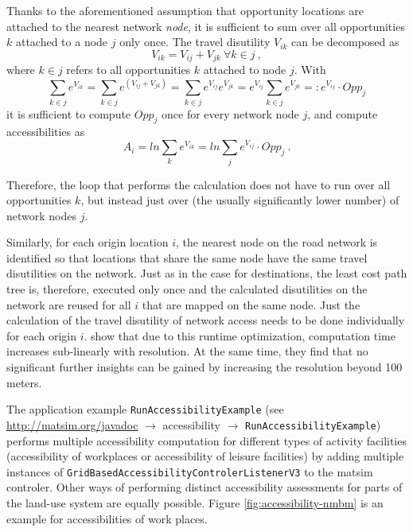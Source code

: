 Thanks to the aforementioned assumption that opportunity locations are attached to the nearest network 
\emph{node}, it is sufficient to sum over all opportunities $k$ attached to a node $j$ only 
once. The travel disutility $V_{ik}$ can be decomposed as
\begin{equation}
V_{ik} = V_{ij} + V_{jk} \ \forall k \in j \ ,
\end{equation}
where $k \in j$ refers to all opportunities $k$ attached to node $j$. With
\begin{equation}
\sum_{k \in j} e^{ V_{ik}} 
%
= \sum_{k \in j} e^{ (V_{ij}+ V_{jk})} 
%
= \sum_{k \in j} e^{ V_{ij}} e^{ V_{jk}} 
%
= e^{ V_{ij}} \sum_{k \in j} e^{ V_{jk}} 
%
=: e^{ V_{ij}} \cdot Opp_j
\end{equation} 
it is sufficient to compute $Opp_j$ once for every network node $j$, and compute accessibilities as
\begin{equation}
A_i = ln \sum_k e^{ V_{ik}}
%
= ln \sum_j e^{ V_{ij}} \cdot Opp_j \ .
\end{equation}

Therefore, the loop that performs the calculation does not have to run over all opportunities $k$, but instead just 
over (the usually significantly lower number) of network nodes $j$.

Similarly, for each origin location $i$, the nearest node on the road network is identified so that locations that 
share the same node have the same travel disutilities on the network. Just as in the case for destinations, the 
least cost path tree is, therefore, executed only once and the calculated disutilities on the network are reused 
for all $i$ that are mapped on the same node. Just the calculation of the travel disutility of network access needs
to be done individually for each origin $i$. \citet{NicolaiNagel2012HiResAccessibilityMethodInBook} show that due 
to this runtime optimization, computation time increases sub-linearly with resolution. At the same time, they find 
that no significant further insights can be gained by increasing the resolution beyond 100\,meters.

The application example \lstinline{RunAccessibilityExample} (see \url{http://matsim.org/javadoc} $\to$ 
accessibility $\to$ \lstinline{RunAccessibilityExample}) performs multiple accessibility computation for different
types of activity facilities (\ie accessibility of workplaces or accessibility
of leisure facilities) by adding multiple instances of \lstinline{GridBasedAccessibilityControlerListenerV3}
to the \gls{matsim} controler. Other ways of performing distinct accessibility assessments for parts of
the land-use system are equally possible. Figure \ref{fig:accessibility-nmbm} is an example for accessibilities
of work places.

